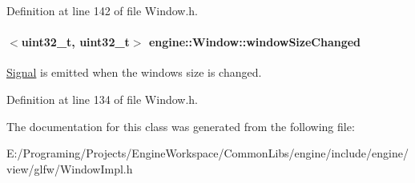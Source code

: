 Definition at line 142 of file Window.\+h.

\paragraph[{\texorpdfstring{window\+Size\+Changed}{windowSizeChanged}}]{$<$uint32\+\_\+t, uint32\+\_\+t$>$ engine\+::\+Window\+::window\+Size\+Changed\hspace{0.3cm}{\ttfamily [inherited]}}\hypertarget{a00082_a20978a09b8843aa8960dc9d3a989b11a}{}\label{a00082_a20978a09b8843aa8960dc9d3a989b11a}
\hyperlink{a00065}{Signal} is emitted when the window\textquotesingle{}s size is changed. 

Definition at line 134 of file Window.\+h.



The documentation for this class was generated from the following file\+:\begin{DoxyCompactItemize}
\item 
E\+:/\+Programing/\+Projects/\+Engine\+Workspace/\+Common\+Libs/engine/include/engine/view/glfw/Window\+Impl.\+h\end{DoxyCompactItemize}
